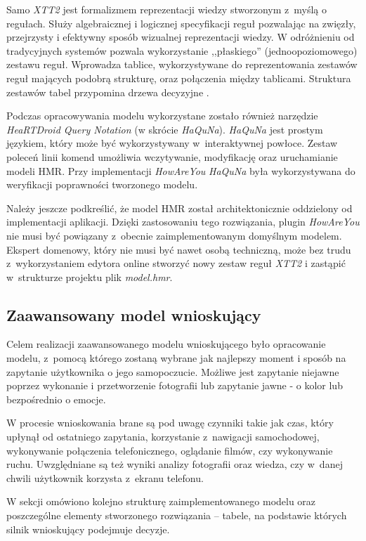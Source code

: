 Samo \textit{XTT2} jest formalizmem reprezentacji wiedzy stworzonym z~myślą o regułach. Służy algebraicznej i logicznej specyfikacji reguł pozwalając na zwięzły, przejrzysty i efektywny sposób wizualnej reprezentacji wiedzy. W odróżnieniu od tradycyjnych systemów pozwala wykorzystanie ,,płaskiego'' (jednoopoziomowego) zestawu reguł. Wprowadza tablice, wykorzystywane do reprezentowania zestawów reguł mających podobrą strukturę, oraz połączenia między tablicami. Struktura zestawów tabel przypomina drzewa decyzyjne \cite{AiWikiHekate}.

Podczas opracowywania modelu wykorzystane zostało również narzędzie \textit{HeaRTDroid Query Notation} (w skrócie \textit{HaQuNa}). \textit{HaQuNa} jest prostym językiem, który może być wykorzystywany w~interaktywnej powłoce. Zestaw poleceń linii komend umożliwia wczytywanie, modyfikację oraz uruchamianie modeli HMR\cite{heartdroid}. Przy implementacji \textit{HowAreYou} \textit{HaQuNa} była wykorzystywana do weryfikacji poprawności tworzonego modelu.

Należy jeszcze podkreślić, że model HMR został architektonicznie oddzielony od implementacji aplikacji. Dzięki zastosowaniu tego rozwiązania, plugin \textit{HowAreYou} nie musi być powiązany z~obecnie zaimplementowanym domyślnym modelem. Ekspert domenowy, który nie musi być nawet osobą techniczną, może bez trudu z~wykorzystaniem edytora online stworzyć nowy zestaw reguł \textit{XTT2} i zastąpić w~strukturze projektu plik \textit{model.hmr}.

\subsection{Zaawansowany model wnioskujący}

Celem realizacji zaawansowanego modelu wnioskującego było opracowanie modelu, z~pomocą którego zostaną wybrane jak najlepszy moment i sposób na zapytanie użytkownika o jego samopoczucie. Możliwe jest zapytanie niejawne poprzez wykonanie i przetworzenie fotografii lub zapytanie jawne - o kolor lub bezpośrednio o emocje.

W procesie wnioskowania brane są pod uwagę czynniki takie jak czas, który upłynął od ostatniego zapytania, korzystanie z~nawigacji samochodowej, wykonywanie połączenia telefonicznego, oglądanie filmów, czy wykonywanie ruchu. Uwzględniane są też wyniki analizy fotografii oraz wiedza, czy w~danej chwili użytkownik korzysta z~ekranu telefonu.

W sekcji omówiono kolejno strukturę zaimplementowanego modelu oraz poszczególne elementy stworzonego rozwiązania -- tabele, na podstawie których silnik wnioskujący podejmuje decyzje.

